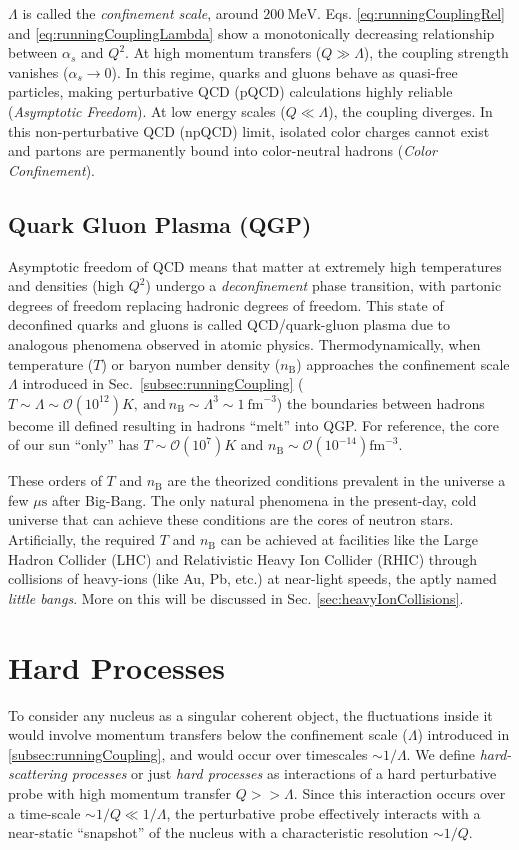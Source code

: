 \(\Lambda\) is called the \emph{confinement scale}, around \(200~\mathrm{MeV}\). Eqs. \ref{eq:runningCouplingRel} and \ref{eq:runningCouplingLambda} show a monotonically decreasing relationship between \(\alpha_s\) and \(Q^2\). At high momentum transfers (\(Q \gg \Lambda\)), the coupling strength vanishes ($\alpha_s \to 0$). In this regime, quarks and gluons behave as quasi-free particles, making perturbative QCD (pQCD) calculations highly reliable (\emph{Asymptotic Freedom}).  At low energy scales (\(Q \ll \Lambda\)), the coupling diverges. In this non-perturbative QCD (npQCD) limit, isolated color charges cannot exist and partons are permanently bound into color-neutral hadrons (\emph{Color Confinement}).

\subsection{Quark Gluon Plasma (QGP)}
Asymptotic freedom of QCD means that matter at extremely high temperatures and densities (high \(Q^2\)) undergo a \emph{deconfinement} phase transition, with partonic degrees of freedom replacing hadronic degrees of freedom. This state of deconfined quarks and gluons is called QCD/quark-gluon plasma due to analogous phenomena observed in atomic physics. Thermodynamically, when temperature (\(T\)) or baryon number density (\(n_\mathrm{B}\)) approaches the confinement scale \(\Lambda\) introduced in Sec.~\ref{subsec:runningCoupling} (\(T \sim \Lambda \sim \mathcal{O}(10^{12})K,~\text{and}~n_\mathrm{B} \sim \Lambda^3 \sim 1~\text{fm}^{-3}\)) the boundaries between hadrons become ill defined resulting in hadrons ``melt'' into QGP.  For reference, the core of our sun ``only'' has \(T\sim \mathcal{O}(10^{7})K\) and \(n_\mathrm{B}\sim\mathcal{O}(10^{-14})\text{fm}^{-3}\). 

These orders of \(T\) and \(n_\mathrm{B}\) are the theorized conditions prevalent in the universe a few \(\mu\mathrm{s}\) after Big-Bang. The only natural phenomena in the present-day, cold universe that can achieve these conditions are the cores of neutron stars. Artificially, the required  \(T\) and \(n_\mathrm{B}\) can be achieved at facilities like the Large Hadron Collider (LHC) and Relativistic Heavy Ion Collider (RHIC) through collisions of heavy-ions (like Au, Pb, etc.) at near-light speeds, the aptly named \emph{little bangs}. More on this will be discussed in Sec. \ref{sec:heavyIonCollisions}. 

\section{Hard Processes}
To consider any nucleus as a singular coherent object, the fluctuations inside it would involve momentum transfers below the confinement scale (\(\Lambda\)) introduced in \ref{subsec:runningCoupling}, and would occur over timescales \(\sim 1/\Lambda\). We define \emph{hard-scattering processes} or just \emph{hard processes} as interactions of a hard perturbative probe with high momentum transfer \(Q >> \Lambda\). Since this interaction occurs over a time-scale \(\sim 1/Q \ll 1/\Lambda\), the perturbative probe effectively interacts with a near-static ``snapshot'' of the nucleus with a characteristic resolution \(\sim 1/Q\). 

